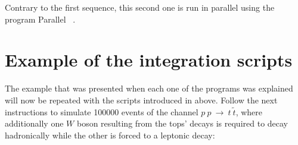 \documentclass[12pt, oneside]{book}              %
\begin{document}
\begin{itemize}
Contrary to the first sequence, this second one is run in parallel using
the program Parallel ~\cite{Tange2011a}.
\end{itemize}

\section{Example of the integration scripts}\label{sec:Example_script}

The example that was presented when each one of the programs was explained
will now be repeated with the scripts introduced in above. Follow the next 
instructions to simulate 100000 events of the channel $ p\ p\ \to\ t\ \tilde{t} $,
where additionally one $ W $ boson resulting from the tops' decays
is required to decay hadronically while the other is forced to a leptonic decay:
\end{document}
